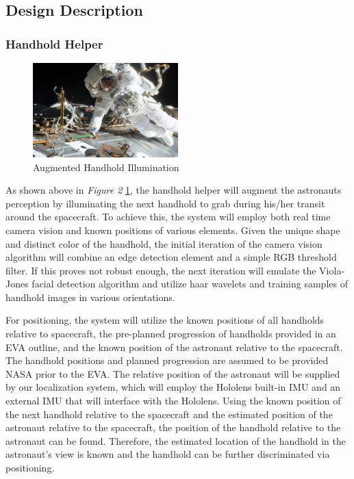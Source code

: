 \documentclass{article}
\let\Oldsubsection\subsection
\renewcommand{\subsection}{\FloatBarrier\Oldsubsection}
\let\Oldsubsubsection\subsubsection
\renewcommand{\subsubsection}{\FloatBarrier\Oldsubsubsection}
\begin{document}
\subsection{Design Description}

\subsubsection{Handhold Helper}

\begin{figure}[!htb]
  \centering
  \includegraphics[width=0.5\textwidth]{assets/markedhandrail.png}
  \caption{Augmented Handhold Illumination}
  \label{fig:markedhandrail}
\end{figure}

As shown above in \textit{Figure 2} \ref{fig:markedhandrail}, the 
handhold helper will augment the astronauts perception by illuminating 
the next handhold to grab during his/her transit around the spacecraft. 
To achieve this, the system will employ both real time camera vision and 
known positions of various elements. Given the unique shape and distinct 
color of the handhold, the initial iteration of the camera vision 
algorithm will combine an edge detection element and a simple RGB 
threshold filter. If this proves not robust enough, the next iteration 
will emulate the Viola-Jones facial detection algorithm and utilize haar 
wavelets and training samples of handhold images in various 
orientations.

For positioning, the system will utilize the known positions of all 
handholds relative to spacecraft, the pre-planned progression of 
handholds provided in an EVA outline, and the known position of the 
astronaut relative to the spacecraft. The handhold positions and planned 
progression are assumed to be provided NASA prior to the EVA. The 
relative position of the astronaut will be supplied by our localization 
system, which will employ the Hololens built-in IMU and an external IMU 
that will interface with the Hololens. Using the known position of the 
next handhold relative to the spacecraft and the estimated position of 
the astronaut relative to the spacecraft, the position of the handhold 
relative to the astronaut can be found. Therefore, the estimated 
location of the handhold in the astronaut’s view is known and the 
handhold can be further discriminated via positioning.
\end{document}
